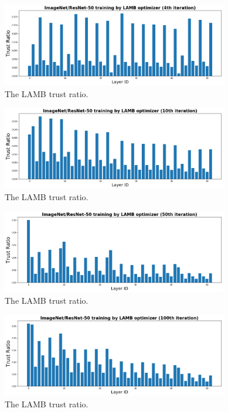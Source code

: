 \begin{figure}[tb]
\vspace{5pt}
\centering
\includegraphics[width=0.88\textwidth]{figs/lamb_ratio_4.png}
\caption{The LAMB trust ratio.}
\label{fig:lamb_ratio_4}
\vspace{-10pt}
\end{figure}

\begin{figure}[tb]
\vspace{5pt}
\centering
\includegraphics[width=0.88\textwidth]{figs/lamb_ratio_10.png}
\caption{The LAMB trust ratio.}
\label{fig:lamb_ratio_10}
\vspace{-10pt}
\end{figure}

\begin{figure}[tb]
\vspace{5pt}
\centering
\includegraphics[width=0.88\textwidth]{figs/lamb_ratio_50.png}
\caption{The LAMB trust ratio.}
\label{fig:lamb_ratio_50}
\vspace{-10pt}
\end{figure}

\begin{figure}[tb]
\vspace{5pt}
\centering
\includegraphics[width=0.88\textwidth]{figs/lamb_ratio_100.png}
\caption{The LAMB trust ratio.}
\label{fig:lamb_ratio_100}
\vspace{-10pt}
\end{figure}


